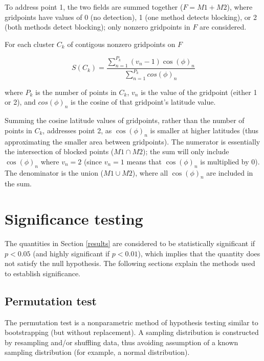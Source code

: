 \documentclass[smallextended]{svjour3}       %
\numberwithin{equation}{section}
\begin{document}
\begin{appendices}
To address point 1, the two fields are summed together ($F=M1+M2$), where gridpoints have values of  0 (no detection), 1 (one method detects blocking), or 2 (both methods detect blocking); only nonzero gridpoints in $F$ are considered. 

For each cluster $C_k$ of contigous nonzero gridpoints on $F$

\begin{equation}
S(C_k) = \frac{\sum\limits_{n=1}^{P_k}\left(v_n-1\right)\cos(\phi)_n}{\sum\limits_{n=1}^{P_k}cos(\phi)_n}
\end{equation}

where $P_k$ is the number of points in $C_k$, $v_n$ is the value of the gridpoint (either 1 or 2), and $cos(\phi)_n$ is the cosine of that gridpoint's latitude value. 

Summing the cosine latitude values of gridpoints, rather than the number of points in $C_k$, addresses point 2, as $\cos(\phi)_n$ is smaller at higher latitudes (thus approximating the smaller area between gridpoints). The numerator is essentially the intersection of blocked points ($M1\cap M2$); the sum will only include $\cos(\phi)_n$ where $v_n=2$ (since $v_n=1$ means that $\cos(\phi)_n$ is multiplied by 0). The denominator is the union ($M1\cup M2$), where all $\cos(\phi)_n$ are included in the sum. 

\section{Significance testing}\label{signifappendix}
The quantities in Section \ref{results} are considered to be statistically significant if $p<0.05$ (and highly significant if $p<0.01$), which implies that the quantity does not satisfy the null hypothesis. The following sections explain the methods used to establish significance.

\subsection{Permutation test}
The permutation test is a nonparametric method of hypothesis testing similar to bootstrapping (but without replacement). A sampling distribution is constructed by resampling and/or shuffling data, thus avoiding assumption of a known sampling distribution (for example, a normal distribution). 


\end{appendices}
\end{document}
